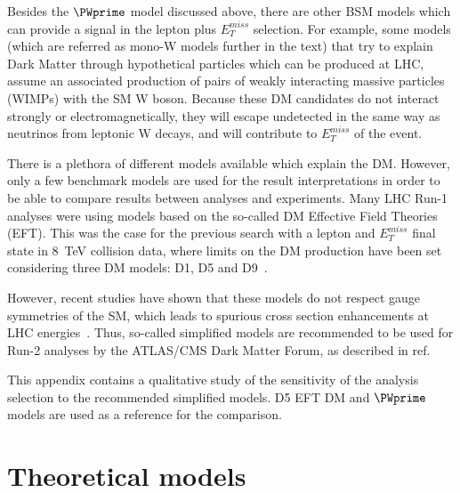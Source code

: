 Besides the $\PWprime$ model discussed above, there are other BSM models 
which can provide a signal in the lepton plus $E_{T}^{miss}$ selection.
For example, some models (which are referred as mono-W models further in the text) that try to explain Dark Matter through hypothetical particles which can be produced at LHC, assume an associated production of pairs of weakly interacting massive particles (WIMPs) with the SM W boson.
Because these DM candidates do not interact strongly or electromagnetically, they will escape undetected in the same way as neutrinos from leptonic W decays, and will contribute to $E_{T}^{miss}$ of the event.

There is a plethora of different models available which explain the DM.
However, only a few benchmark models are used for the result interpretations in order to be able to compare results between analyses and experiments.
Many LHC Run-1 analyses were using models based on the so-called DM Effective Field Theories (EFT). 
This was the case for the previous search with a lepton and $E_T^{miss}$ final state in 8~TeV collision data, where limits on the DM production have been set considering three DM models: D1, D5 and D9~\cite{wprime_8TeV}. 

However, recent studies have shown that these models do not respect gauge symmetries of the SM, which leads to spurious cross section enhancements at LHC energies~\cite{arXiv:1503.07874}.
Thus, so-called simplified models are recommended to be used for Run-2 analyses
by the ATLAS/CMS Dark Matter Forum, as described in ref.~\cite{DM_forum_2015}

This appendix contains a qualitative study of the sensitivity of the analysis selection
to the recommended simplified models. D5 EFT DM and $\PWprime$ models are used as a reference for the comparison.



\section{Theoretical models}

